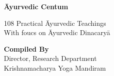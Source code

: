 \thispagestyle{empty}


\begin{center}
\textbf{\large Āyurvedic Centum}
\end{center}
\vfill

\begin{center}
108 Practical Āyurvedic Teachings\\
With foucs on Āyurvedic Dinacaryā
\end{center}
\vfill

\begin{center}
\textbf{Compiled By}\\
Director, Research Department\\
Krishnamacharya Yoga Mandiram
\end{center}
\vfill
\eject

